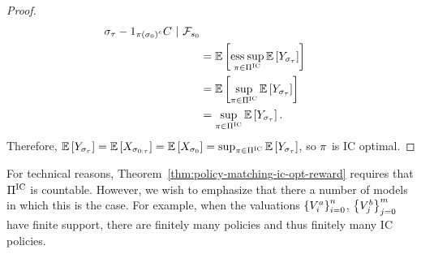 \begin{proof}
\begin{align*}
{{{                    \sigma_{\tau}
                }
                -
                1_{
                    \pi\left(\sigma_{0}\right)^c
                }
                C~
                |
                ~
                \mathcal{F}_{s_{0}}
            }
        }
        \\
        &=
        \mathbb{E}\left[
            \operatorname*{ess\hspace{0.08cm}sup}_{
                \pi\in\Pi^{\text{IC}}
            }
            \mathbb{E}\left[
                Y_{
                    \sigma_{\tau}
                }
            \right]
        \right]
        \\
        &=
        \mathbb{E}\left[
            \sup_{
                \pi\in\Pi^{\text{IC}}
            }
            \mathbb{E}\left[
                Y_{
                    \sigma_{\tau}
                }
            \right]
        \right]
        \\
        &=
        \sup_{
            \pi\in\Pi^{\text{IC}}
        }
        \mathbb{E}\left[
            Y_{
                \sigma_{\tau}
            }
        \right] .
    \end{align*}  
    Therefore,
    \(
        \mathbb{E}\left[
            Y_{
                \sigma_{\tau}
            }
        \right]
        =
        \mathbb{E}\left[
            X_{
                \sigma_{0:\tau}
            }
        \right]
        =
        \mathbb{E}\left[
            X_{
                \sigma_{0}
            }
        \right]
        =
        \sup_{
            \pi\in\Pi^{\text{IC}}
        }
        \mathbb{E}\left[
            Y_{
                \sigma_{\tau}
            }
        \right]
    \), so $\pi$ is IC optimal.
\end{proof}  

For technical reasons, Theorem~\ref{thm:policy-matching-ic-opt-reward} requires that 
$\Pi^{\text{IC}}$ is countable.
However, we wish to emphasize that there a number of models in which this is the case.
For example, when the valuations $\left\{V^a_{i}\right\}_{i=0}^n$,  
$\left\{V^b_{j}\right\}_{j=0}^m$ have finite support, there are finitely many policies
and thus finitely many IC policies.




